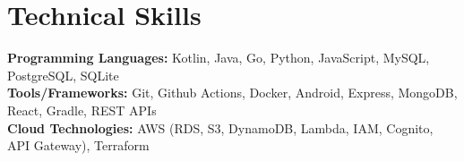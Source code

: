 \documentclass[letterpaper,11pt]{article}
\newcommand\tab[1][1cm]{\hspace*{#1}}
\newcommand{\resumeItem}[1]{
  \item\small{
    {#1 \vspace{-2.pt}}
  }
}
\newcommand{\resumeItemListStart}{\begin{itemize}}
\newcommand{\resumeItemListEnd}{\end{itemize}\vspace{-5pt}}
\begin{document}
\section{\textbf{Technical Skills}}
 \begin{itemize}[leftmargin=0.15in, label={}]
    \small{\item{
     \textbf{Programming Languages:} \tab[1.98cm] {Kotlin, Java, Go, Python, JavaScript, MySQL, PostgreSQL, SQLite} \\
     \vspace{3pt}
     \textbf{Tools/Frameworks:} \tab[2.975cm] {Git, Github Actions, Docker, Android, Express, MongoDB, React, Gradle, REST APIs} \\
     \vspace{3pt}
     \textbf{Cloud Technologies:} \tab[2.85cm] {AWS (RDS, S3, DynamoDB, Lambda, IAM, Cognito, API Gateway), Terraform} \\
     \vspace{1pt}
    }}
 \end{itemize}
 

\end{document}
